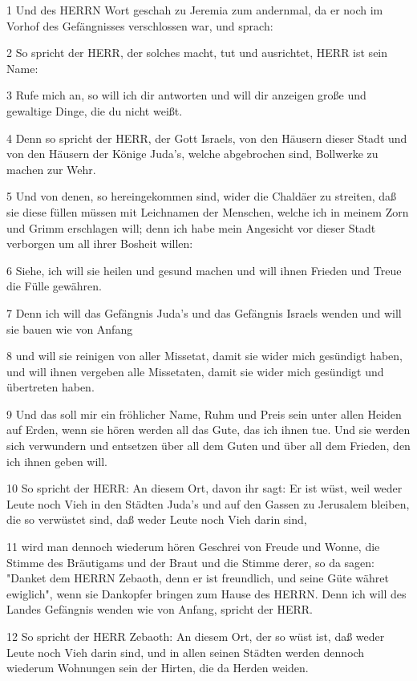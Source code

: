 \par 1 Und des HERRN Wort geschah zu Jeremia zum andernmal, da er noch im Vorhof des Gefängnisses verschlossen war, und sprach:
\par 2 So spricht der HERR, der solches macht, tut und ausrichtet, HERR ist sein Name:
\par 3 Rufe mich an, so will ich dir antworten und will dir anzeigen große und gewaltige Dinge, die du nicht weißt.
\par 4 Denn so spricht der HERR, der Gott Israels, von den Häusern dieser Stadt und von den Häusern der Könige Juda's, welche abgebrochen sind, Bollwerke zu machen zur Wehr.
\par 5 Und von denen, so hereingekommen sind, wider die Chaldäer zu streiten, daß sie diese füllen müssen mit Leichnamen der Menschen, welche ich in meinem Zorn und Grimm erschlagen will; denn ich habe mein Angesicht vor dieser Stadt verborgen um all ihrer Bosheit willen:
\par 6 Siehe, ich will sie heilen und gesund machen und will ihnen Frieden und Treue die Fülle gewähren.
\par 7 Denn ich will das Gefängnis Juda's und das Gefängnis Israels wenden und will sie bauen wie von Anfang
\par 8 und will sie reinigen von aller Missetat, damit sie wider mich gesündigt haben, und will ihnen vergeben alle Missetaten, damit sie wider mich gesündigt und übertreten haben.
\par 9 Und das soll mir ein fröhlicher Name, Ruhm und Preis sein unter allen Heiden auf Erden, wenn sie hören werden all das Gute, das ich ihnen tue. Und sie werden sich verwundern und entsetzen über all dem Guten und über all dem Frieden, den ich ihnen geben will.
\par 10 So spricht der HERR: An diesem Ort, davon ihr sagt: Er ist wüst, weil weder Leute noch Vieh in den Städten Juda's und auf den Gassen zu Jerusalem bleiben, die so verwüstet sind, daß weder Leute noch Vieh darin sind,
\par 11 wird man dennoch wiederum hören Geschrei von Freude und Wonne, die Stimme des Bräutigams und der Braut und die Stimme derer, so da sagen: "Danket dem HERRN Zebaoth, denn er ist freundlich, und seine Güte währet ewiglich", wenn sie Dankopfer bringen zum Hause des HERRN. Denn ich will des Landes Gefängnis wenden wie von Anfang, spricht der HERR.
\par 12 So spricht der HERR Zebaoth: An diesem Ort, der so wüst ist, daß weder Leute noch Vieh darin sind, und in allen seinen Städten werden dennoch wiederum Wohnungen sein der Hirten, die da Herden weiden.
